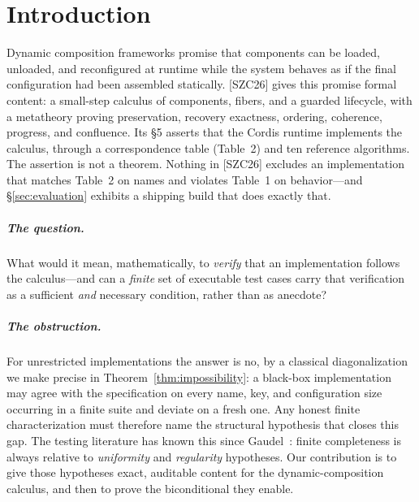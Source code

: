 \documentclass[sigplan,screen,review,nonacm]{acmart}
\newcommand{\SZC}{[SZC26]}
\begin{document}
\maketitle

\section{Introduction}\label{sec:intro}

Dynamic composition frameworks promise that components can be loaded, unloaded,
and reconfigured at runtime while the system behaves as if the final configuration
had been assembled statically. \SZC{} gives this promise formal content: a
small-step calculus of components, fibers, and a guarded lifecycle, with a
metatheory proving preservation, recovery exactness, ordering, coherence,
progress, and confluence. Its \S 5 asserts that the Cordis runtime implements the
calculus, through a correspondence table (Table~2) and ten reference algorithms.
The assertion is not a theorem. Nothing in \SZC{} excludes an implementation that
matches Table~2 on names and violates Table~1 on behavior---and
\S\ref{sec:evaluation} exhibits a shipping build that does exactly that.

\subparagraph{The question.} What would it mean, mathematically, to \emph{verify}
that an implementation follows the calculus---and can a \emph{finite} set of
executable test cases carry that verification as a sufficient \emph{and} necessary
condition, rather than as anecdote?

\subparagraph{The obstruction.} For unrestricted implementations the answer is
no, by a classical diagonalization we make precise in
Theorem~\ref{thm:impossibility}: a black-box implementation may agree with the
specification on every name, key, and configuration size occurring in a finite
suite and deviate on a fresh one. Any honest finite characterization must
therefore name the structural hypothesis that closes this gap. The testing
literature has known this since Gaudel~\cite{gaudel95}: finite completeness is
always relative to \emph{uniformity} and \emph{regularity} hypotheses. Our
contribution is to give those hypotheses exact, auditable content for the
dynamic-composition calculus, and then to prove the biconditional they enable.
\end{document}
